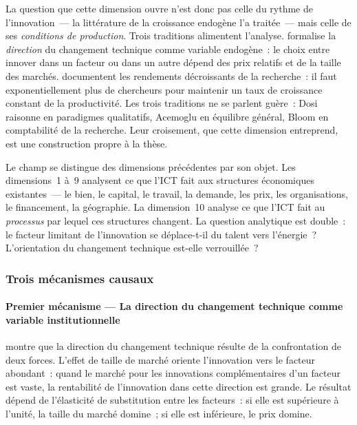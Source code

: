 La question que cette dimension ouvre n'est donc pas celle du rythme de l'innovation~--- la littérature de la croissance endogène l'a traitée~--- mais celle de ses \emph{conditions de production}. Trois traditions alimentent l'analyse.  \textcite{acemoglu_directed_2002} formalise la \emph{direction} du changement technique comme variable endogène~: le choix entre innover dans un facteur ou dans un autre dépend des prix relatifs et de la taille des marchés. \textcite{bloom_ideas_2020} documentent les rendements décroissants de la recherche~: il faut exponentiellement plus de chercheurs pour maintenir un taux de croissance constant de la productivité. Les trois traditions ne se parlent guère~: Dosi raisonne en paradigmes qualitatifs, Acemoglu en équilibre général, Bloom en comptabilité de la recherche. Leur croisement, que cette dimension entreprend, est une construction propre à la thèse.

Le champ se distingue des dimensions précédentes par son objet. Les dimensions~1 à~9 analysent ce que l'ICT fait aux structures économiques existantes~--- le bien, le capital, le travail, la demande, les prix, les organisations, le financement, la géographie. La dimension~10 analyse ce que l'ICT fait au \emph{processus} par lequel ces structures changent. La question analytique est double~: le facteur limitant de l'innovation se déplace-t-il du talent vers l'énergie~? L'orientation du changement technique est-elle verrouillée~?


\subsubsection{Trois mécanismes causaux}


\paragraph{Premier mécanisme --- La direction du changement technique comme variable institutionnelle}

\markNEO \markEVO
\textcite{acemoglu_directed_2002} montre que la direction du changement technique résulte de la confrontation de deux forces.  L'effet de taille de marché oriente l'innovation vers le facteur abondant~: quand le marché pour les innovations complémentaires d'un facteur est vaste, la rentabilité de l'innovation dans cette direction est grande. Le résultat dépend de l'élasticité de substitution entre les facteurs~: si elle est supérieure à l'unité, la taille du marché domine~; si elle est inférieure, le prix domine.

